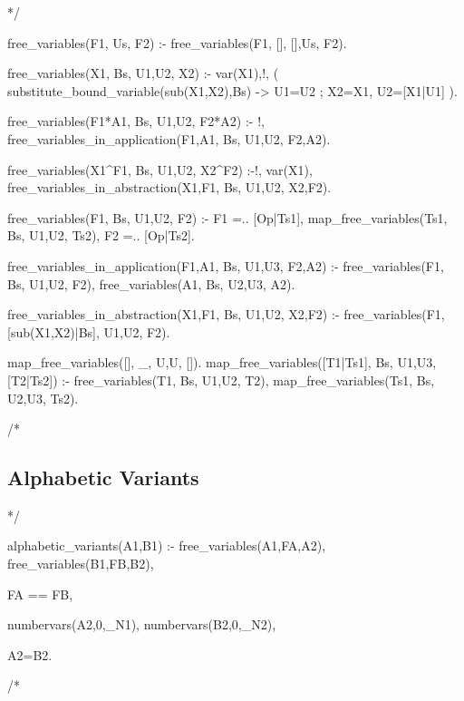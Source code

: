\documentclass{book}[9pt]
\newenvironment{code}%
{\small \verbatim}%
{\endverbatim \large}
\begin{document}
\begin{code}
*/

free_variables(F1, Us, F2) :- free_variables(F1, [], [],Us, F2).

free_variables(X1, Bs, U1,U2, X2) :- var(X1),!,
        ( substitute_bound_variable(sub(X1,X2),Bs) ->
            U1=U2
        ;
            X2=X1,
            U2=[X1|U1]
        ).

free_variables(F1*A1, Bs, U1,U2, F2*A2) :- !,
        free_variables_in_application(F1,A1, Bs, U1,U2, F2,A2).

free_variables(X1^F1, Bs, U1,U2, X2^F2) :-!,
        var(X1),
        free_variables_in_abstraction(X1,F1, Bs, U1,U2, X2,F2).

free_variables(F1, Bs, U1,U2, F2) :-
        F1 =.. [Op|Ts1],
        map_free_variables(Ts1, Bs, U1,U2, Ts2),
        F2 =.. [Op|Ts2].

free_variables_in_application(F1,A1, Bs, U1,U3, F2,A2) :-
        free_variables(F1, Bs, U1,U2, F2),
        free_variables(A1, Bs, U2,U3, A2).

free_variables_in_abstraction(X1,F1, Bs, U1,U2, X2,F2) :-
        free_variables(F1, [sub(X1,X2)|Bs], U1,U2, F2).

map_free_variables([], _, U,U, []).
map_free_variables([T1|Ts1], Bs, U1,U3, [T2|Ts2]) :-
        free_variables(T1, Bs, U1,U2, T2),
        map_free_variables(Ts1, Bs, U2,U3, Ts2).

/*
\end{code}

\subsection{Alphabetic Variants}

\begin{code}
*/

alphabetic_variants(A1,B1) :-
        free_variables(A1,FA,A2),
        free_variables(B1,FB,B2),

        FA == FB,

        numbervars(A2,0,_N1),
        numbervars(B2,0,_N2),

        A2=B2.

/*
\end{code}
\end{document}
